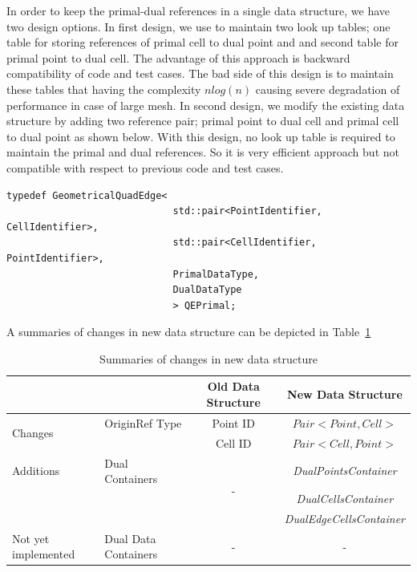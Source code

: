 \documentclass{InsightArticle}
\begin{document}
In order to keep the primal-dual references in a single data structure, we have two design options. In first design, we use to maintain two look up tables; one table for storing references of primal cell to dual point and and second table for primal point to dual cell. The advantage of this approach is backward compatibility of code and test cases. The bad side of this design is to maintain these tables that having the complexity $nlog(n)$ causing severe degradation of performance in case of large mesh. In second design, we modify the existing data structure by adding two reference pair; primal point to dual cell and primal cell to dual point as shown below. With this design, no look up table is required to maintain the primal and dual references. So it is very efficient approach but not compatible with respect to previous code and test cases. 

\begin{verbatim}
typedef GeometricalQuadEdge<
                             std::pair<PointIdentifier, CellIdentifier>,
                             std::pair<CellIdentifier,  PointIdentifier>,
                             PrimalDataType, 
                             DualDataType
                             > QEPrimal;
\end{verbatim}
A summaries of changes in new data structure can be depicted in Table~\ref{table:secondDesign}
\begin{table}
	\begin{center}
		\caption{Summaries of changes in new data structure}
		\label{table:secondDesign}
		\begin{tabular}{ l|l|c|c }
			\hline	
			{\bf  }	& {\bf } 	& {\bf Old Data Structure}	& {\bf New Data Structure}\\
			\hline  	
			\multirow{2}{*}{\vspace{0.5cm}Changes}  & OriginRef Type & Point ID & $Pair<Point, Cell>$ \\
			  &  &  Cell ID & $Pair<Cell, Point>$ \\ 
			Additions & Dual Containers & \multirow{3}{*}{-} & \emph{DualPointsContainer} \\ 
			  &  &  & \emph{DualCellsContainer} \\ 
			  &  &  & \emph{DualEdgeCellsContainer}\\
			Not yet implemented & Dual Data Containers &  - &  -  \\
			\hline
	\end{tabular}
	\end{center}
\end{table}
\end{document}
